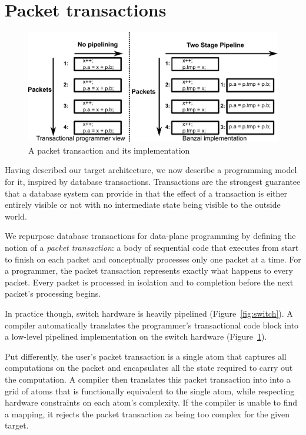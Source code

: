 \section{Packet transactions}
\begin{figure}
  \includegraphics[width=\columnwidth]{spec_vs_impl.pdf}
  \caption{A packet transaction and its implementation}
  \label{fig:trans}
\end{figure}

Having described our target architecture, we now describe a programming model
for it, inspired by database transactions. Transactions are the strongest
guarantee that a database system can provide in that the effect of a
transaction is either entirely visible or not with no intermediate state being
visible to the outside world.

We repurpose database transactions for data-plane programming by defining the
notion of a \textit{packet transaction}: a body of sequential code that
executes from start to finish on each packet and conceptually processes only
one packet at a time. For a programmer, the packet transaction represents
exactly what happens to every packet. Every packet is processed in isolation
and to completion before the next packet's processing begins.

In practice though, switch hardware is heavily pipelined
(Figure~\ref{fig:switch}).  A compiler automatically translates the
programmer's transactional code block into a low-level pipelined implementation
on the switch hardware (Figure~\ref{fig:trans}).

Put differently, the user's packet transaction is a single atom that captures
all computations on the packet and encapsulates all the state required to carry
out the computation.  A compiler then translates this packet transaction into
into a grid of atoms that is functionally equivalent to the single atom, while
respecting hardware constraints on each atom's complexity. If the compiler is
unable to find a mapping, it rejects the packet transaction as being too
complex for the given target.
